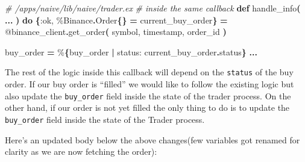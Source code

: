 \documentclass[
  oneside]{book}
\newenvironment{Shaded}{\begin{snugshade}}{\end{snugshade}}
\newcommand{\CommentTok}[1]{\textcolor[rgb]{0.56,0.35,0.01}{\textit{#1}}}
\newcommand{\ConstantTok}[1]{\textcolor[rgb]{0.56,0.35,0.01}{#1}}
\newcommand{\FunctionTok}[1]{\textcolor[rgb]{0.13,0.29,0.53}{\textbf{#1}}}
\newcommand{\KeywordTok}[1]{\textcolor[rgb]{0.13,0.29,0.53}{\textbf{#1}}}
\newcommand{\NormalTok}[1]{#1}
\newcommand{\OperatorTok}[1]{\textcolor[rgb]{0.81,0.36,0.00}{\textbf{#1}}}
\newcommand{\OtherTok}[1]{\textcolor[rgb]{0.56,0.35,0.01}{#1}}
\newcommand{\VariableTok}[1]{\textcolor[rgb]{0.00,0.00,0.00}{#1}}
\begin{document}
\begin{Shaded}
\begin{Highlighting}[]
  \CommentTok{\# /apps/naive/lib/naive/trader.ex}
  \CommentTok{\# inside the same callback}
  \KeywordTok{def}\NormalTok{ handle\_info}\FunctionTok{(}
      \OperatorTok{...}
      \FunctionTok{)} \KeywordTok{do}
    \FunctionTok{\{}\VariableTok{:ok}\NormalTok{, \%}\ConstantTok{Binance}\OperatorTok{.}\ConstantTok{Order}\FunctionTok{\{\}} \OperatorTok{=}\NormalTok{ current\_buy\_order}\FunctionTok{\}} \OperatorTok{=}
      \OtherTok{@binance\_client}\OperatorTok{.}\NormalTok{get\_order}\FunctionTok{(}
\NormalTok{        symbol,}
\NormalTok{        timestamp,}
\NormalTok{        order\_id}
      \FunctionTok{)}
    
\NormalTok{    buy\_order }\OperatorTok{=}\NormalTok{ \%}\FunctionTok{\{}\NormalTok{buy\_order }\OperatorTok{|} \VariableTok{status:}\NormalTok{ current\_buy\_order}\OperatorTok{.}\NormalTok{status}\FunctionTok{\}}
    \OperatorTok{...}
\end{Highlighting}
\end{Shaded}

The rest of the logic inside this callback will depend on the \texttt{status} of the buy order. If our buy order is ``filled'' we would like to follow the existing logic but also update the \texttt{buy\_order} field inside the state of the trader process. On the other hand, if our order is not yet filled the only thing to do is to update the \texttt{buy\_order} field inside the state of the Trader process.

Here's an updated body below the above changes(few variables got renamed for clarity as we are now fetching the order):
\end{document}
